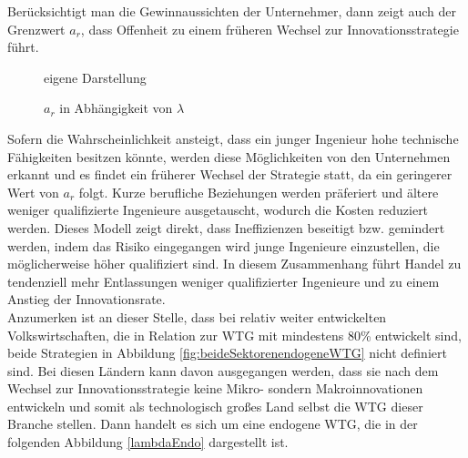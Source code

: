%
Berücksichtigt man die Gewinnaussichten der Unternehmer, dann zeigt auch der Grenzwert $a_r$, dass Offenheit zu einem früheren Wechsel zur Innovationsstrategie führt. \\
%
	\begin{figure*}[h]
%			
		\hfill{}  eigene Darstellung
		\caption{$a_r$ in Abhängigkeit von $\lambda$ }
		\label{fig:VerhaltenAR}
	\end{figure*}
%
Sofern die Wahrscheinlichkeit ansteigt, dass ein junger Ingenieur hohe technische Fähigkeiten besitzen könnte, werden diese Möglichkeiten von den Unternehmen erkannt und es findet ein früherer Wechsel der Strategie statt, da ein geringerer Wert von $a_r$ folgt. Kurze berufliche Beziehungen werden präferiert und ältere  weniger qualifizierte Ingenieure ausgetauscht, wodurch die Kosten reduziert werden. Dieses Modell zeigt direkt, dass Ineffizienzen beseitigt bzw. gemindert werden, indem das Risiko eingegangen wird junge Ingenieure einzustellen, die möglicherweise höher qualifiziert sind.
%
In diesem Zusammenhang führt Handel zu tendenziell mehr Entlassungen weniger qualifizierter Ingenieure und zu einem Anstieg der Innovationsrate.\\
%
Anzumerken ist an dieser Stelle, dass bei relativ weiter entwickelten Volkswirtschaften, die in Relation zur WTG mit mindestens 80\% entwickelt sind, beide Strategien in Abbildung \ref{fig:beideSektorenendogeneWTG} nicht definiert sind. Bei diesen Ländern kann davon ausgegangen werden, dass sie nach dem Wechsel zur Innovationsstrategie keine Mikro- sondern Makroinnovationen entwickeln und somit als technologisch großes Land selbst die WTG dieser Branche stellen. Dann handelt es sich um eine endogene WTG, die in der folgenden Abbildung \ref{lambdaEndo} dargestellt ist.\\
